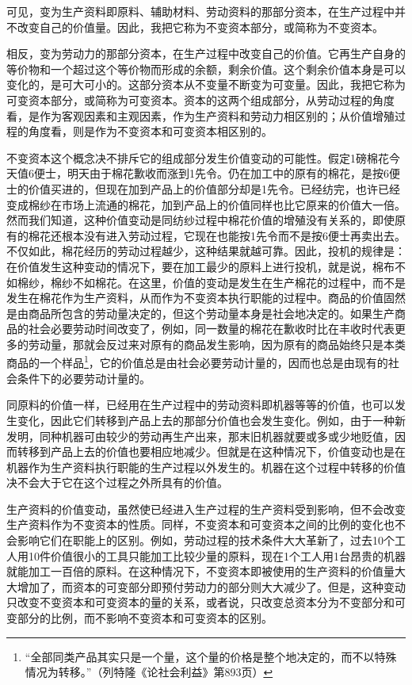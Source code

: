 \documentclass{ctexbook}
\begin{document}
可见，变为生产资料即原料、辅助材料、劳动资料的那部分资本，在生产过程中并不改变自己的价值量。因此，我把它称为不变资本部分，或简称为不变资本。

相反，变为劳动力的那部分资本，在生产过程中改变自己的价值。它再生产自身的等价物和一个超过这个等价物而形成的余额，剩余价值。这个剩余价值本身是可以变化的，是可大可小的。这部分资本从不变量不断变为可变量。因此，我把它称为可变资本部分，或简称为可变资本。资本的这两个组成部分，从劳动过程的角度看，是作为客观因素和主观因素，作为生产资料和劳动力相区别的；从价值增殖过程的角度看，则是作为不变资本和可变资本相区别的。

不变资本这个概念决不排斥它的组成部分发生价值变动的可能性。假定1磅棉花今天值6便士，明天由于棉花歉收而涨到1先令。仍在加工中的原有的棉花，是按6便士的价值买进的，但现在加到产品上的价值部分却是1先令。已经纺完，也许已经变成棉纱在市场上流通的棉花，加到产品上的价值同样也比它原来的价值大一倍。然而我们知道，这种价值变动是同纺纱过程中棉花价值的增殖没有关系的，即使原有的棉花还根本没有进入劳动过程，它现在也能按1先令而不是按6便士再卖出去。不仅如此，棉花经历的劳动过程越少，这种结果就越可靠。因此，投机的规律是：在价值发生这种变动的情况下，要在加工最少的原料上进行投机，就是说，棉布不如棉纱，棉纱不如棉花。在这里，价值的变动是发生在生产棉花的过程中，而不是发生在棉花作为生产资料，从而作为不变资本执行职能的过程中。商品的价值固然是由商品所包含的劳动量决定的，但这个劳动量本身是社会地决定的。如果生产商品的社会必要劳动时间改变了，例如，同一数量的棉花在歉收时比在丰收时代表更多的劳动量，那就会反过来对原有的商品发生影响，因为原有的商品始终只是本类商品的一个样品\footnote{“全部同类产品其实只是一个量，这个量的价格是整个地决定的，而不以特殊情况为转移。”（列特隆《论社会利益》第893页）}，它的价值总是由社会必要劳动计量的，因而也总是由现有的社会条件下的必要劳动计量的。

同原料的价值一样，已经用在生产过程中的劳动资料即机器等等的价值，也可以发生变化，因此它们转移到产品上去的那部分价值也会发生变化。例如，由于一种新发明，同种机器可由较少的劳动再生产出来，那末旧机器就要或多或少地贬值，因而转移到产品上去的价值也要相应地减少。但就是在这种情况下，价值变动也是在机器作为生产资料执行职能的生产过程以外发生的。机器在这个过程中转移的价值决不会大于它在这个过程之外所具有的价值。

生产资料的价值变动，虽然使已经进入生产过程的生产资料受到影响，但不会改变生产资料作为不变资本的性质。同样，不变资本和可变资本之间的比例的变化也不会影响它们在职能上的区别。例如，劳动过程的技术条件大大革新了，过去10个工人用10件价值很小的工具只能加工比较少量的原料，现在1个工人用1台昂贵的机器就能加工一百倍的原料。在这种情况下，不变资本即被使用的生产资料的价值量大大增加了，而资本的可变部分即预付劳动力的部分则大大减少了。但是，这种变动只改变不变资本和可变资本的量的关系，或者说，只改变总资本分为不变部分和可变部分的比例，而不影响不变资本和可变资本的区别。
\end{document}
